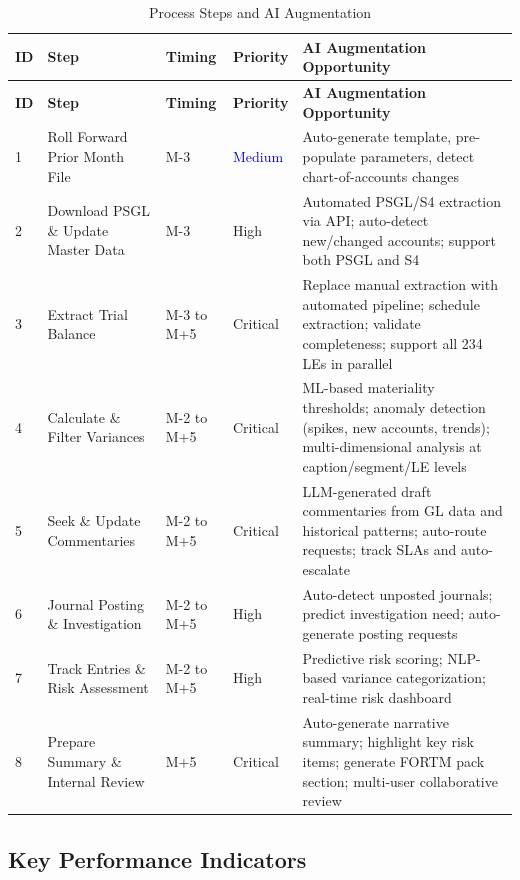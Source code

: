 \documentclass[11pt,a4paper]{article}
\begin{document}
\begin{longtable}{p{0.5cm}p{3.5cm}p{1cm}p{1.2cm}p{6cm}}
\caption{Process Steps and AI Augmentation} \\
\toprule
\textbf{ID} & \textbf{Step} & \textbf{Timing} & \textbf{Priority} & \textbf{AI Augmentation Opportunity} \\
\midrule
\endfirsthead
\toprule
\textbf{ID} & \textbf{Step} & \textbf{Timing} & \textbf{Priority} & \textbf{AI Augmentation Opportunity} \\
\midrule
\endhead
1 & Roll Forward Prior Month File & M-3 & \textcolor{mediumblue}{Medium} &
    Auto-generate template, pre-populate parameters, detect chart-of-accounts changes \\
\midrule
2 & Download PSGL \& Update Master Data & M-3 & \textcolor{highorange}{High} &
    Automated PSGL/S4 extraction via API; auto-detect new/changed accounts; support both PSGL and S4 \\
\midrule
3 & Extract Trial Balance & M-3 to M+5 & \textcolor{criticalred}{Critical} &
    Replace manual extraction with automated pipeline; schedule extraction; validate completeness; support all 234 LEs in parallel \\
\midrule
4 & Calculate \& Filter Variances & M-2 to M+5 & \textcolor{criticalred}{Critical} &
    ML-based materiality thresholds; anomaly detection (spikes, new accounts, trends); multi-dimensional analysis at caption/segment/LE levels \\
\midrule
5 & Seek \& Update Commentaries & M-2 to M+5 & \textcolor{criticalred}{Critical} &
    LLM-generated draft commentaries from GL data and historical patterns; auto-route requests; track SLAs and auto-escalate \\
\midrule
6 & Journal Posting \& Investigation & M-2 to M+5 & \textcolor{highorange}{High} &
    Auto-detect unposted journals; predict investigation need; auto-generate posting requests \\
\midrule
7 & Track Entries \& Risk Assessment & M-2 to M+5 & \textcolor{highorange}{High} &
    Predictive risk scoring; NLP-based variance categorization; real-time risk dashboard \\
\midrule
8 & Prepare Summary \& Internal Review & M+5 & \textcolor{criticalred}{Critical} &
    Auto-generate narrative summary; highlight key risk items; generate FORTM pack section; multi-user collaborative review \\
\bottomrule
\end{longtable}

\subsection{Key Performance Indicators}
\end{document}
